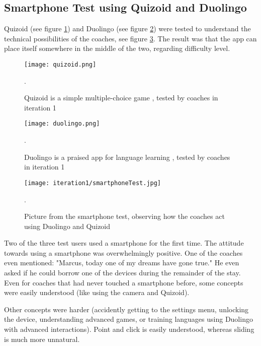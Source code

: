     \subsection{Smartphone Test using Quizoid and Duolingo}

    Quizoid (see figure \ref{fig:quizoid}) and Duolingo (see figure \ref{fig:duolingo}) were tested to understand the technical possibilities of the coaches, see figure \ref{fig:smartphoneTest}. The result was that the app can place itself somewhere in the middle of the two, regarding difficulty level.

    \begin{figure}[h]
        \centering
        \texttt{[image: quizoid.png]}
        \caption{Quizoid is a simple multiple-choice game \citep{quizoid}, tested by coaches in iteration 1}.
        \label{fig:quizoid}
    \end{figure}

    \begin{figure}[h]
        \centering
        \texttt{[image: duolingo.png]}
        \caption{Duolingo is a praised app for language learning \citep{duolingo}, tested by coaches in iteration 1}.
        \label{fig:duolingo}
    \end{figure}

    \begin{figure}[h]
        \centering
        \texttt{[image: iteration1/smartphoneTest.jpg]}
        \caption{Picture from the smartphone test, observing how the coaches act using Duolingo and Quizoid}.
        \label{fig:smartphoneTest}
    \end{figure}

    \clearpage

    Two of the three test users used a smartphone for the first time. The attitude towards using a smartphone was overwhelmingly positive. One of the coaches even mentioned: "Marcus, today one of my dreams have gone true." He even asked if he could borrow one of the devices during the remainder of the stay. Even for coaches that had never touched a smartphone before, some concepts were easily understood (like using the camera and Quizoid).

    Other concepts were harder (accidently getting to the settings menu, unlocking the device, understanding advanced games, or training languages using Duolingo with advanced interactions). Point and click is easily understood, whereas sliding is much more unnatural.
